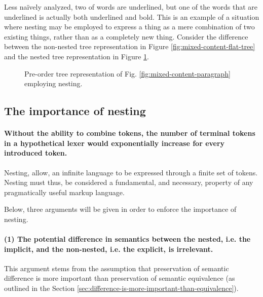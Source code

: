 \documentclass{scrreprt}
\begin{document}
Less naïvely analyzed, two of words are underlined, but one of the words that are underlined is actually both underlined and bold. This is an example of a situation where nesting may be employed to express a thing as a mere combination of two existing things, rather than as a completely new thing. Consider the difference between the non-nested tree representation in Figure \ref{fig:mixed-content-flat-tree} and the nested tree representation in Figure \ref{fig:mixed-content-tree}.


\begin{figure}[h]
  \centering

  \caption{Pre-order tree representation of Fig. \ref{fig:mixed-content-paragraph} employing nesting.}
  \label{fig:mixed-content-tree}
\end{figure}






\subsection{The importance of nesting}
\paragraph{Without the ability to combine tokens, the number of terminal tokens in a hypothetical lexer would exponentially increase for every introduced token.} Nesting, allow, an infinite language to be expressed through a finite set of tokens. Nesting must thus, be considered a fundamental, and necessary, property of any pragmatically useful markup language.

Below, three arguments will be given in order to enforce the importance of nesting.


\paragraph{(1) The potential difference in semantics between the nested, i.e. the implicit, and the non-nested, i.e. the explicit, is irrelevant.}
This argument stems from the assumption that preservation of semantic difference is more important than preservation of semantic equivalence (as outlined in the Section \ref{sec:difference-is-more-important-than-equivalence}).
\end{document}
